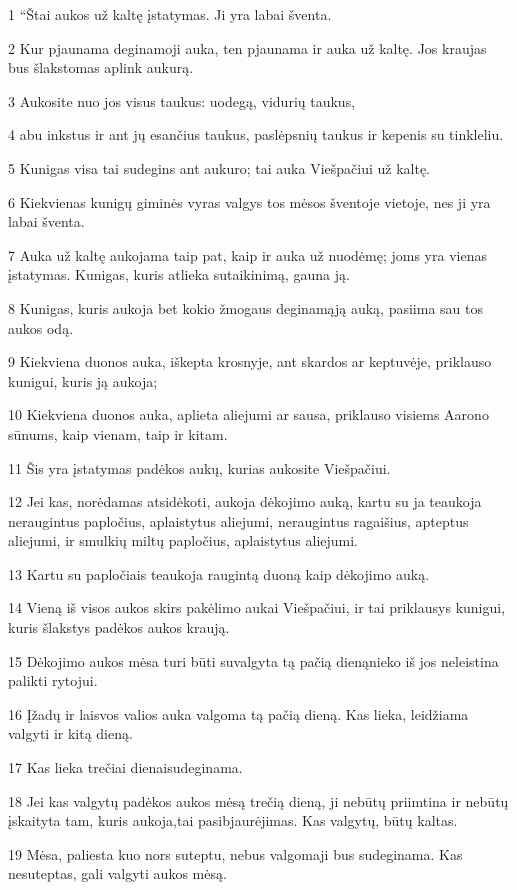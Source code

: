 \par 1 “Štai aukos už kaltę įstatymas. Ji yra labai šventa. 
\par 2 Kur pjaunama deginamoji auka, ten pjaunama ir auka už kaltę. Jos kraujas bus šlakstomas aplink aukurą. 
\par 3 Aukosite nuo jos visus taukus: uodegą, vidurių taukus, 
\par 4 abu inkstus ir ant jų esančius taukus, paslėpsnių taukus ir kepenis su tinkleliu. 
\par 5 Kunigas visa tai sudegins ant aukuro; tai auka Viešpačiui už kaltę. 
\par 6 Kiekvienas kunigų giminės vyras valgys tos mėsos šventoje vietoje, nes ji yra labai šventa. 
\par 7 Auka už kaltę aukojama taip pat, kaip ir auka už nuodėmę; joms yra vienas įstatymas. Kunigas, kuris atlieka sutaikinimą, gauna ją. 
\par 8 Kunigas, kuris aukoja bet kokio žmogaus deginamąją auką, pasiima sau tos aukos odą. 
\par 9 Kiekviena duonos auka, iškepta krosnyje, ant skardos ar keptuvėje, priklauso kunigui, kuris ją aukoja; 
\par 10 Kiekviena duonos auka, aplieta aliejumi ar sausa, priklauso visiems Aarono sūnums, kaip vienam, taip ir kitam. 
\par 11 Šis yra įstatymas padėkos aukų, kurias aukosite Viešpačiui. 
\par 12 Jei kas, norėdamas atsidėkoti, aukoja dėkojimo auką, kartu su ja teaukoja neraugintus papločius, aplaistytus aliejumi, neraugintus ragaišius, apteptus aliejumi, ir smulkių miltų papločius, aplaistytus aliejumi. 
\par 13 Kartu su papločiais teaukoja raugintą duoną kaip dėkojimo auką. 
\par 14 Vieną iš visos aukos skirs pakėlimo aukai Viešpačiui, ir tai priklausys kunigui, kuris šlakstys padėkos aukos kraują. 
\par 15 Dėkojimo aukos mėsa turi būti suvalgyta tą pačią dieną­nieko iš jos neleistina palikti rytojui. 
\par 16 Įžadų ir laisvos valios auka valgoma tą pačią dieną. Kas lieka, leidžiama valgyti ir kitą dieną. 
\par 17 Kas lieka trečiai dienai­sudeginama. 
\par 18 Jei kas valgytų padėkos aukos mėsą trečią dieną, ji nebūtų priimtina ir nebūtų įskaityta tam, kuris aukoja,­tai pasibjaurėjimas. Kas valgytų, būtų kaltas. 
\par 19 Mėsa, paliesta kuo nors suteptu, nebus valgoma­ji bus sudeginama. Kas nesuteptas, gali valgyti aukos mėsą. 
